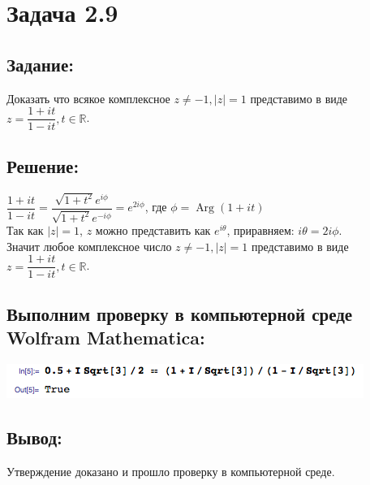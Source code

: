 \section{Задача 2.9}
\subsection{Задание:}
Доказать что всякое комплексное $ z \neq -1, |z| = 1 $ представимо в виде $ z = \dfrac{1+it}{1-it}, t \in \mathbb{R} $.
\subsection{Решение:}
$
	\dfrac{1+it}{1-it}
	=
	\dfrac{\sqrt{1+t^2}e^{i\phi}}{\sqrt{1+t^2}e^{-i\phi}}
	=
	e^{2i\phi}
$, где $ \phi = \operatorname{Arg} (1 + it) $
\\
Так как $ |z| = 1 $, $ z $ можно представить как $ e^{i\theta} $, приравняем: $ i\theta = 2i\phi $.
\\
Значит любое комплексное число $ z \neq -1, |z| = 1 $ представимо в виде $ z = \dfrac{1+it}{1-it}, t \in \mathbb{R} $.
\subsection{Выполним проверку в компьютерной среде Wolfram Mathematica:}
\includegraphics[scale=0.6]{task/2_09/screen.png}
\subsection{Вывод:}
Утверждение доказано и прошло проверку в компьютерной среде.
